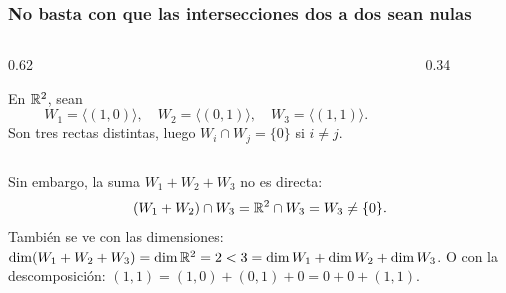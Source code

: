 \begin{frame}
    \frametitle{No basta con que las intersecciones dos a dos sean nulas}

    \begin{columns}[T]
        \begin{column}{0.62\textwidth}
            \begin{example}
                En $\mathbb{R}^2$, sean
                \[
                    W_1=\langle(1,0)\rangle,\quad
                    W_2=\langle(0,1)\rangle,\quad
                    W_3=\langle(1,1)\rangle.
                \]
                Son tres rectas distintas, luego $W_i\cap W_j=\{0\}$ si
                $i\neq j$.
            \end{example}
        \end{column}
        \begin{column}{0.34\textwidth}
            \centering
        \end{column}
    \end{columns}

    \medskip

    Sin embargo, la suma $W_1+W_2+W_3$ \alert{no} es directa:
    \[
        (W_1+W_2)\cap W_3=\mathbb{R}^2\cap W_3=W_3\neq\{0\}.
    \]
    También se ve con las dimensiones:
    $\dim(W_1+W_2+W_3)=\dim\mathbb{R}^2=2<3=\dim W_1+\dim W_2+\dim W_3$.
    O con la descomposición: $(1,1)=(1,0)+(0,1)+0=0+0+(1,1)$.
\end{frame}
